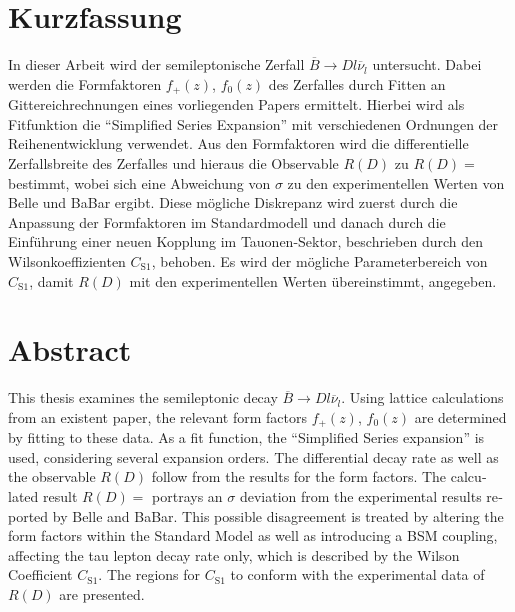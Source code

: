 \thispagestyle{plain}

\section*{Kurzfassung}
In dieser Arbeit wird der semileptonische Zerfall $\overline{B} \to D l \overline{\nu}_l$ untersucht.
Dabei werden die Formfaktoren $f_+(z)$, $f_0(z)$ des Zerfalles durch Fitten an Gittereichrechnungen eines vorliegenden Papers ermittelt.
Hierbei wird als Fitfunktion die \enquote{Simplified Series Expansion} mit verschiedenen Ordnungen der Reihenentwicklung verwendet.
Aus den Formfaktoren wird die differentielle Zerfallsbreite des Zerfalles und hieraus die Observable $R(D)$ zu $R(D) = $ bestimmt, wobei sich eine Abweichung von $\sigma$ zu den experimentellen Werten von Belle und BaBar ergibt.
Diese mögliche Diskrepanz wird zuerst durch die Anpassung der Formfaktoren im Standardmodell und danach durch die Einführung einer neuen Kopplung im Tauonen-Sektor, beschrieben durch den Wilsonkoeffizienten $C_{\text{S}1}$, behoben.
Es wird der mögliche Parameterbereich von $C_{\text{S}1}$, damit $R(D)$ mit den experimentellen Werten übereinstimmt, angegeben.


\section*{Abstract}
\begin{english}
This thesis examines the semileptonic decay $\overline{B} \to D l \overline{\nu}_l$.
Using lattice calculations from an existent paper, the relevant form factors $f_+(z)$, $f_0(z)$ are determined by fitting to these data.
As a fit function, the \enquote{Simplified Series expansion} is used, considering several expansion orders.
The differential decay rate as well as the observable $R(D)$ follow from the results for the form factors.
The calculated result $R(D) = $ portrays an $\sigma$ deviation from the experimental results reported by Belle and BaBar.
This possible disagreement is treated by altering the form factors within the Standard Model as well as introducing a BSM coupling, affecting the tau lepton decay rate only, which is described by the Wilson Coefficient $C_{\text{S}1}$.
The regions for $C_{\text{S}1}$ to conform with the experimental data of $R(D)$ are presented.
\end{english}
